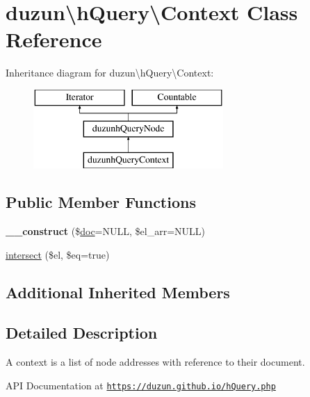 \hypertarget{classduzun_1_1hQuery_1_1Context}{}\section{duzun\textbackslash{}h\+Query\textbackslash{}Context Class Reference}
\label{classduzun_1_1hQuery_1_1Context}
Inheritance diagram for duzun\textbackslash{}h\+Query\textbackslash{}Context\+:\begin{figure}[H]
\begin{center}
\leavevmode
\includegraphics[height=3.000000cm]{classduzun_1_1hQuery_1_1Context}
\end{center}
\end{figure}
\subsection*{Public Member Functions}
\begin{DoxyCompactItemize}
\item 
\mbox{\label{classduzun_1_1hQuery_1_1Context_a41294b6ffc5058da32d895bfcf4714b1}} 
{\bfseries \+\_\+\+\_\+construct} (\$\mbox{\hyperlink{classduzun_1_1hQuery_1_1Node_abd060c044c66e49189d8e4fb491f3b3d}{doc}}=N\+U\+LL, \$el\+\_\+arr=N\+U\+LL)
\item 
\mbox{\hyperlink{classduzun_1_1hQuery_1_1Context_a8a3539a583a8e00f3bbd39b114b73542}{intersect}} (\$el, \$eq=true)
\end{DoxyCompactItemize}
\subsection*{Additional Inherited Members}


\subsection{Detailed Description}
A context is a list of node addresses with reference to their document.

A\+PI Documentation at \href{https://duzun.github.io/hQuery.php}{\tt https\+://duzun.\+github.\+io/h\+Query.\+php}

